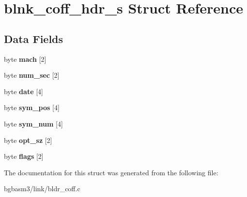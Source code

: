\hypertarget{structblnk__coff__hdr__s}{\section{blnk\-\_\-coff\-\_\-hdr\-\_\-s Struct Reference}
\label{structblnk__coff__hdr__s}
}
\subsection*{Data Fields}
\begin{DoxyCompactItemize}
\item 
\hypertarget{structblnk__coff__hdr__s_a48aa36a85b200eeaed748e7d4d4a1b65}{byte {\bfseries mach} \mbox{[}2\mbox{]}}\label{structblnk__coff__hdr__s_a48aa36a85b200eeaed748e7d4d4a1b65}

\item 
\hypertarget{structblnk__coff__hdr__s_ac2fb34c8ff2be43408571b97c5a7af3a}{byte {\bfseries num\-\_\-sec} \mbox{[}2\mbox{]}}\label{structblnk__coff__hdr__s_ac2fb34c8ff2be43408571b97c5a7af3a}

\item 
\hypertarget{structblnk__coff__hdr__s_a2a62b7892102f73215a6408aec1ed8c6}{byte {\bfseries date} \mbox{[}4\mbox{]}}\label{structblnk__coff__hdr__s_a2a62b7892102f73215a6408aec1ed8c6}

\item 
\hypertarget{structblnk__coff__hdr__s_a96546998e2563637e46abc6f402092ab}{byte {\bfseries sym\-\_\-pos} \mbox{[}4\mbox{]}}\label{structblnk__coff__hdr__s_a96546998e2563637e46abc6f402092ab}

\item 
\hypertarget{structblnk__coff__hdr__s_a62c2025675482738bb796686534d3991}{byte {\bfseries sym\-\_\-num} \mbox{[}4\mbox{]}}\label{structblnk__coff__hdr__s_a62c2025675482738bb796686534d3991}

\item 
\hypertarget{structblnk__coff__hdr__s_a94c1290e986fa6cba4b904f2f7cd3dc6}{byte {\bfseries opt\-\_\-sz} \mbox{[}2\mbox{]}}\label{structblnk__coff__hdr__s_a94c1290e986fa6cba4b904f2f7cd3dc6}

\item 
\hypertarget{structblnk__coff__hdr__s_a7d48b6d1e199851b9edba6f03b6be734}{byte {\bfseries flags} \mbox{[}2\mbox{]}}\label{structblnk__coff__hdr__s_a7d48b6d1e199851b9edba6f03b6be734}

\end{DoxyCompactItemize}


The documentation for this struct was generated from the following file\-:\begin{DoxyCompactItemize}
\item 
bgbasm3/link/bldr\-\_\-coff.\-c\end{DoxyCompactItemize}
